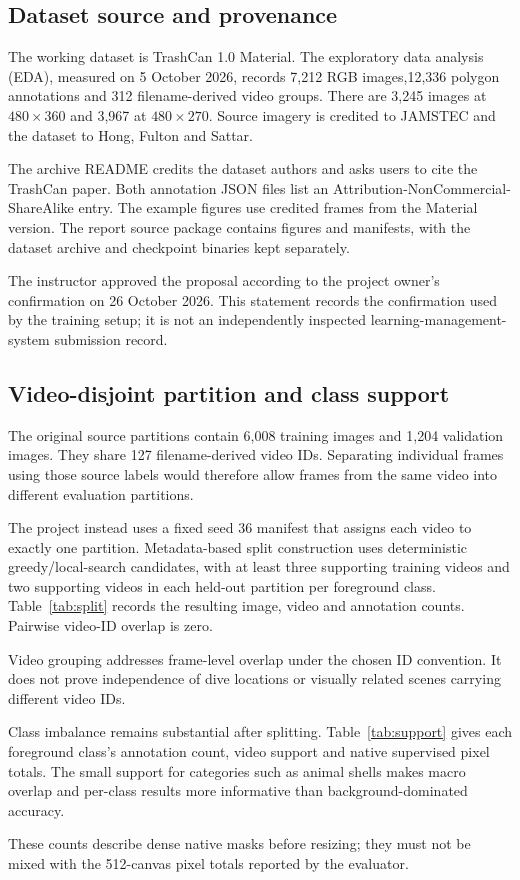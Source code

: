 \subsection{Dataset source and provenance}
The working dataset is TrashCan 1.0 Material. The exploratory data analysis (EDA), measured on 5 October 2026, records 7,212 RGB images,12,336 polygon annotations and 312 filename-derived video groups. There are 3,245 images at $480\times 360$ and 3,967 at $480\times 270$. Source imagery is credited to JAMSTEC and the dataset to Hong, Fulton and Sattar\cite{trashcan}.

The archive README credits the dataset authors and asks users to cite the TrashCan paper. Both annotation JSON files list an Attribution-NonCommercial-ShareAlike entry. The example figures use credited frames from the Material version. The report source package contains figures and manifests, with the dataset archive and checkpoint binaries kept separately.

The instructor approved the proposal according to the project owner's confirmation on 26 October 2026. This statement records the confirmation used by the training setup; it is not an independently inspected learning-management-system submission record.

\subsection{Video-disjoint partition and class support}
The original source partitions contain 6,008 training images and 1,204 validation images. They share 127 filename-derived video IDs. Separating individual frames using those source labels would therefore allow frames from the same video into different evaluation partitions.

The project instead uses a fixed seed 36 manifest that assigns each video to exactly one partition. Metadata-based split construction uses deterministic greedy/local-search candidates, with at least three supporting training videos and two supporting videos in each held-out partition per foreground class. Table~\ref{tab:split} records the resulting image, video and annotation counts. Pairwise video-ID overlap is zero.

Video grouping addresses frame-level overlap under the chosen ID convention. It does not prove independence of dive locations or visually related scenes carrying different video IDs.

Class imbalance remains substantial after splitting. Table~\ref{tab:support} gives each foreground class's annotation count, video support and native supervised pixel totals. The small support for categories such as animal shells makes macro overlap and per-class results more informative than background-dominated accuracy.

These counts describe dense native masks before resizing; they must not be mixed with the 512-canvas pixel totals reported by the evaluator.

